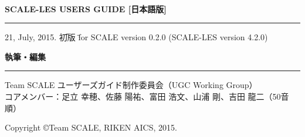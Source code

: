 \newpage
\thispagestyle{empty}

　\\

\vspace{10mm}
{\large{\bf SCALE-LES USERS GUIDE [日本語版]}}\\
\hrule width 90mm
\begin{tabbing} 
21, July, 2015.  \= \=  初版  \= \=  for SCALE version 0.2.0 (SCALE-LES version 4.2.0)
\end{tabbing} 


\vspace{10mm}
{\large{\bf 執筆・編集}}\\
\hrule width 90mm
\begin{tabbing} 
Team SCALE ユーザーズガイド制作委員会（UGC Working Group）\\
コアメンバー：足立 幸穂、佐藤 陽祐、富田 浩文、山浦 剛、吉田 龍二（50音順）\\
\end{tabbing} 


\vspace{110mm}
\begin{flushright}

\vspace{10mm}
Copyright \copyright Team SCALE, RIKEN AICS, 2015.
\end{flushright}

